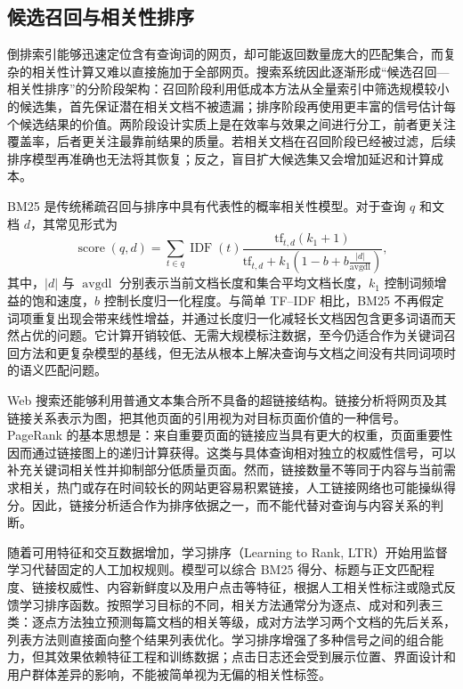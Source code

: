 \subsection{候选召回与相关性排序}

倒排索引能够迅速定位含有查询词的网页，却可能返回数量庞大的匹配集合，而复杂的相关性计算又难以直接施加于全部网页。搜索系统因此逐渐形成“候选召回—相关性排序”的分阶段架构：召回阶段利用低成本方法从全量索引中筛选规模较小的候选集，首先保证潜在相关文档不被遗漏；排序阶段再使用更丰富的信号估计每个候选结果的价值。两阶段设计实质上是在效率与效果之间进行分工，前者更关注覆盖率，后者更关注最靠前结果的质量。若相关文档在召回阶段已经被过滤，后续排序模型再准确也无法将其恢复；反之，盲目扩大候选集又会增加延迟和计算成本。

BM25 是传统稀疏召回与排序中具有代表性的概率相关性模型。对于查询 $q$ 和文档 $d$，其常见形式为
\begin{equation}
  \operatorname{score}(q,d)
  =\sum_{t\in q}\operatorname{IDF}(t)
  \frac{\mathrm{tf}_{t,d}(k_1+1)}
  {\mathrm{tf}_{t,d}+k_1\left(1-b+b\frac{|d|}{\operatorname{avgdl}}\right)},
  \label{eq:bm25}
\end{equation}
其中，$|d|$ 与 $\operatorname{avgdl}$ 分别表示当前文档长度和集合平均文档长度，$k_1$ 控制词频增益的饱和速度，$b$ 控制长度归一化程度。与简单 TF--IDF 相比，BM25 不再假定词项重复出现会带来线性增益，并通过长度归一化减轻长文档因包含更多词语而天然占优的问题\parencite{robertson2009bm25}。它计算开销较低、无需大规模标注数据，至今仍适合作为关键词召回方法和更复杂模型的基线，但无法从根本上解决查询与文档之间没有共同词项时的语义匹配问题。

Web 搜索还能够利用普通文本集合所不具备的超链接结构。链接分析将网页及其链接关系表示为图，把其他页面的引用视为对目标页面价值的一种信号。PageRank 的基本思想是：来自重要页面的链接应当具有更大的权重，页面重要性因而通过链接图上的递归计算获得\parencite{brin1998anatomy}。这类与具体查询相对独立的权威性信号，可以补充关键词相关性并抑制部分低质量页面。然而，链接数量不等同于内容与当前需求相关，热门或存在时间较长的网站更容易积累链接，人工链接网络也可能操纵得分。因此，链接分析适合作为排序依据之一，而不能代替对查询与内容关系的判断。

随着可用特征和交互数据增加，学习排序（Learning to Rank, LTR）开始用监督学习代替固定的人工加权规则。模型可以综合 BM25 得分、标题与正文匹配程度、链接权威性、内容新鲜度以及用户点击等特征，根据人工相关性标注或隐式反馈学习排序函数。按照学习目标的不同，相关方法通常分为逐点、成对和列表三类：逐点方法独立预测每篇文档的相关等级，成对方法学习两个文档的先后关系，列表方法则直接面向整个结果列表优化\parencite{liu2009ltr}。学习排序增强了多种信号之间的组合能力，但其效果依赖特征工程和训练数据；点击日志还会受到展示位置、界面设计和用户群体差异的影响，不能被简单视为无偏的相关性标签。


